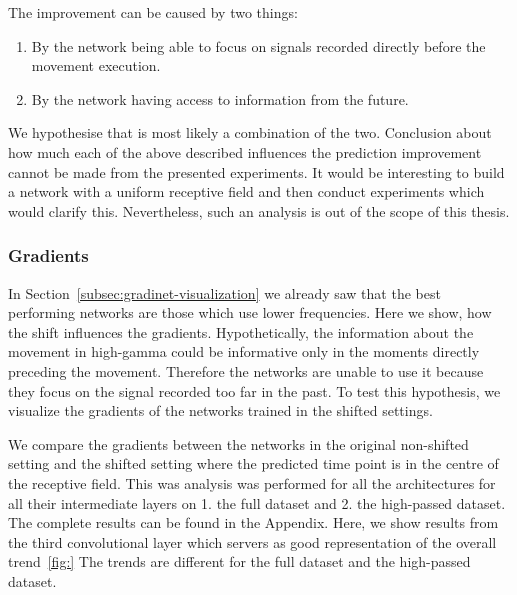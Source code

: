 The improvement can be caused by two things:
\begin{enumerate}
    \item By the network being able to focus on signals recorded directly before the movement execution.
    \item By the network having access to information from the future.
\end{enumerate}

We hypothesise that is most likely a combination of the two.
Conclusion about how much each of the above described influences the prediction improvement cannot be made from the presented experiments.
It would be interesting to build a network with a uniform receptive field and then conduct experiments which would clarify this.
Nevertheless, such an analysis is out of the scope of this thesis.

\subsubsection{Gradients}
In Section~\ref{subsec:gradinet-visualization} we already saw that the best performing networks are those which use lower frequencies.
Here we show, how the shift influences the gradients.
Hypothetically, the information about the movement in high-gamma could be informative only in the moments directly preceding the movement.
Therefore the networks are unable to use it because they focus on the signal recorded too far in the past.
To test this hypothesis, we visualize the gradients of the networks trained in the shifted settings.

We compare the gradients between the networks in the original non-shifted setting and the shifted setting where the predicted time point is in the centre of the receptive field.
This was analysis was performed for all the architectures for all their intermediate layers on 1. the full dataset and 2. the high-passed dataset.
The complete results can be found in the Appendix.
Here, we show results from the third convolutional layer which servers as good representation of the overall trend~\ref{fig:}
The trends are different for the full dataset and the high-passed dataset.

